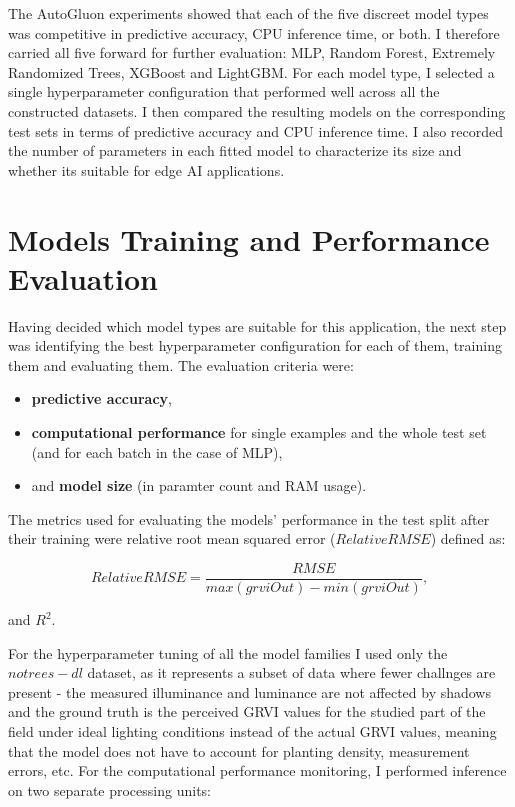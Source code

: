 The AutoGluon experiments showed that each of the five discreet model types was competitive in predictive accuracy, CPU inference time, or both. I therefore carried all five forward for further evaluation: MLP, Random Forest, Extremely Randomized Trees, XGBoost and LightGBM. For each model type, I selected a single hyperparameter configuration that performed well across all the constructed datasets. I then compared the resulting models on the corresponding test sets in terms of predictive accuracy and CPU inference time. I also recorded the number of parameters in each fitted model to characterize its size and whether its suitable for edge AI applications.

\section{Models Training and Performance Evaluation}

Having decided which model types are suitable for this application, the next step was identifying the best hyperparameter configuration for each of them, training them and evaluating them. The evaluation criteria were:

\begin{itemize}
    \item \textbf{predictive accuracy},
    \item \textbf{computational performance} for single examples and the whole test set (and for each batch in the case of MLP),
    \item and \textbf{model size} (in paramter count and RAM usage).
\end{itemize}

The metrics used for evaluating the models' performance in the test split after their training were relative root mean squared error ($RelativeRMSE$) defined as:

\begin{equation}
    RelativeRMSE = \frac{RMSE}{max(grviOut)-min(grviOut)},
\end{equation}

and $R^2$.

For the hyperparameter tuning of all the model families I used only the $notrees-dl$ dataset, as it represents a subset of data where fewer challnges are present - the measured illuminance and luminance are not affected by shadows and the ground truth is the perceived GRVI values for the studied part of the field under ideal lighting conditions instead of the actual GRVI values, meaning that the model does not have to account for planting density, measurement errors, etc. For the computational performance monitoring, I performed inference on two separate processing units:


